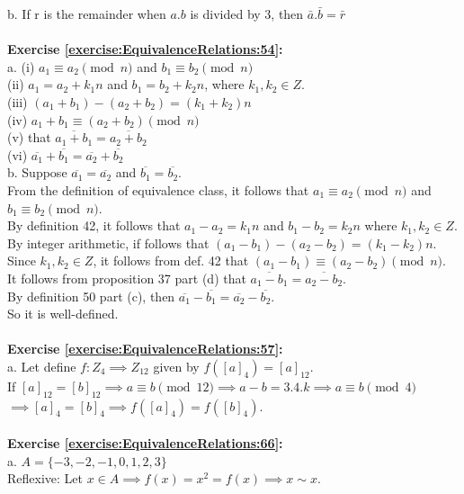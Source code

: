b. If r is the remainder when $a.b$ is divided by 3, then $\bar{a}.\bar{b}=\bar{r}$\\
\\
\textbf{Exercise \ref{exercise:EquivalenceRelations:54}:}\\
a. (i) $a_1\equiv a_2\pmod{n}$ and $b_1\equiv b_2\pmod{n}$\\
(ii) $a_1=a_2 + k_1n$ and $b_1= b_2 + k_2n$, where $k_1,k_2 \in Z$.\\
(iii) $(a_1+b_1)- (a_2+b_2) = (k_1+k_2)n$\\
(iv) $a_1+b_1 \equiv (a_2+b_2)\pmod{n}$\\
(v) that $\overline{a_1+b_1}=\overline{a_2+b_2}$\\
(vi) $\overline{a_1}+\overline{b_1}=\overline{a_2}+\overline{b_2}$\\
b. Suppose $\overline{a_1}=\overline{a_2}$ and $\overline{b_1}=\overline{b_2}$.\\
From the definition of equivalence class, it follows that $a_1\equiv a_2\pmod{n}$ and $b_1\equiv b_2\pmod{n}$.\\
By definition 42, it follows that $a_1-a_2=k_1n$ and $b_1-b_2=k_2n$ where $k_1,k_2 \in Z$.\\
By integer arithmetic, if follows that $(a_1-b_1)-(a_2-b_2)=(k_1-k_2)n$.\\
Since $k_1,k_2 \in Z$, it follows from def. 42 that $(a_1-b_1)\equiv (a_2-b_2)\pmod{n}$.\\
It follows from proposition 37 part (d) that $\overline{a_1-b_1}=\overline{a_2-b_2}$.\\
By definition 50 part (c), then $\overline{a_1}-\overline{b_1}=\overline{a_2}-\overline{b_2}$.\\
So it is well-defined.\\
\\
\textbf{Exercise \ref{exercise:EquivalenceRelations:57}:}\\
a. Let define $f:Z_4\implies Z_{12}$ given by $f([a]_4)=[a]_{12}$.\\
If $[a]_{12}=[b]_{12} \implies a\equiv b\pmod{12} \implies a-b=3.4.k \implies a\equiv b\pmod{4}$\\
$\implies [a]_4=[b]_4 \implies f([a]_4)=f([b]_4)$.\\
\\
\textbf{Exercise \ref{exercise:EquivalenceRelations:66}:}\\
a. $A=\{-3,-2,-1,0,1,2,3\}$\\
Reflexive: Let $x\in A \implies f(x)=x^2=f(x) \implies x\sim x$.\\
